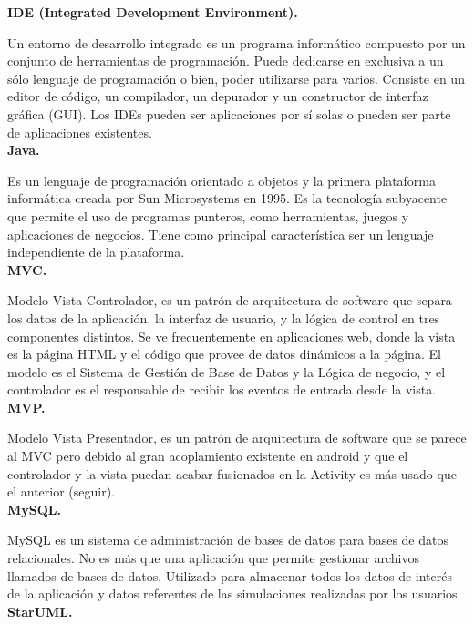 \documentclass[../pfc.tex]{subfiles}
\begin{document}
	\textbf{IDE (Integrated Development Environment).}
	
	Un entorno de desarrollo integrado es un programa
	informático compuesto por un conjunto de herramientas de programación. Puede dedicarse en
	exclusiva a un sólo lenguaje de programación o bien, poder utilizarse para varios. Consiste en un
	editor de código, un compilador, un depurador y un constructor de interfaz gráfica (GUI). Los IDEs
	pueden ser aplicaciones por sí solas o pueden ser parte de aplicaciones existentes.\\
	
	\textbf{Java.}
	
	Es un lenguaje de programación orientado a objetos y la primera plataforma informática
	creada por Sun Microsystems en 1995. Es la tecnología subyacente que permite el uso de
	programas punteros, como herramientas, juegos y aplicaciones de negocios. Tiene como principal
	característica ser un lenguaje independiente de la plataforma.\\
	
	\textbf{MVC.}
	
	Modelo Vista Controlador, es un patrón de arquitectura de software que separa los datos de
	la aplicación, la interfaz de usuario, y la lógica de control en tres componentes distintos. Se ve
	frecuentemente en aplicaciones web, donde la vista es la página HTML y el código que provee de
	datos dinámicos a la página. El modelo es el Sistema de Gestión de Base de Datos y la Lógica de
	negocio, y el controlador es el responsable de recibir los eventos de entrada desde la vista.\\
	
	\textbf{MVP.}
	
	Modelo Vista Presentador, es un patrón de arquitectura de software que se parece al MVC pero debido al gran acoplamiento existente en android y que el controlador y la vista puedan acabar fusionados en la Activity es más usado que el anterior (seguir).\\
	
	\textbf{MySQL.}
	
	MySQL es un sistema de administración de bases de datos para bases de datos
	relacionales. No es más que una aplicación que permite gestionar archivos llamados de bases de
	datos. Utilizado para almacenar todos los datos de interés de la aplicación y datos referentes de las
	simulaciones realizadas por los usuarios.\\
	
	\textbf{StarUML.}
	
\end{document}
